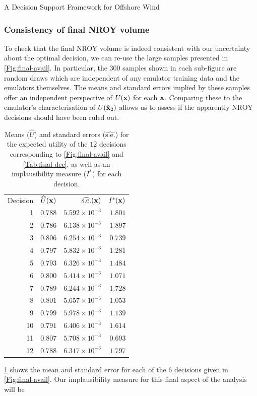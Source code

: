 \begin{chapter}{A Decision Support Framework for Offshore Wind \label{Ch:ds-for-ow}}
\subsubsection{Consistency of final NROY volume}
To check that the final NROY volume is indeed consistent with our uncertainty about the optimal decision, we can re-use the large samples presented in \cref{Fig:final-avail}. In particular, the $300$ samples shown in each sub-figure are random draws which are independent of any emulator training data and the emulators themselves. The means and standard errors implied by these samples offer an independent perspective of $U(\mathbf{x})$ for each $\mathbf{x}$. Comparing these to the emulator's characterisation of $U(\hat{\mathbf{x}}_2)$ allows us to assess if the apparently NROY decisions should have been ruled out.
\begin{table}
\centering
\begin{tabular}{rrrr}
 \toprule
 Decision & $\widehat{U}(\mathbf{x})$ & $\widehat{\text{s.e.}}(\mathbf{x})$ & $I^{*}(\mathbf{x})$ \\\cmidrule{1-4}
 1 & $0.788$ & $5.592\times 10^{-3}$ & $1.801$ \\
  2 & $0.786$ & $6.138\times 10^{-3}$ & $1.897$ \\
  3 & $0.806$ & $6.254\times 10^{-3}$ & $0.739$ \\
  4 & $0.797$ & $5.832\times 10^{-3}$ & $1.281$ \\
  5 & $0.793$ & $6.326\times 10^{-3}$ & $1.484$ \\
  6 & $0.800$ & $5.414\times 10^{-3}$ & $1.071$ \\
  7 & $0.789$ & $6.244\times 10^{-3}$ & $1.728$ \\
  8 & $0.801$ & $5.657\times 10^{-3}$ & $1.053$ \\
  9 & $0.799$ & $5.978\times 10^{-3}$ & $1.139$ \\
  10 & $0.791$ & $6.406\times 10^{-3}$ & $1.614$ \\
  11 & $0.807$ & $5.708\times 10^{-3}$ & $0.693$ \\
  12 & $0.788$ & $6.317\times 10^{-3}$ & $1.797$ \\\bottomrule
\end{tabular}
\caption{Means ($\widehat{U}$) and standard errors ($\widehat{\text{s.e.}}$) for the expected utility of the $12$ decisions corresponding to \cref{Fig:final-avail} and \cref{Tab:final-dec}, as well as an implausibility measure ($I^{*}$) for each decision. \label{Tab:final-dec-implaus} }
\end{table}
\cref{Tab:final-dec-implaus} shows the mean and standard error for each of the $6$ decisions given in \cref{Fig:final-avail}. Our implausibility measure for this final aspect of the analysis will be

\end{chapter}
